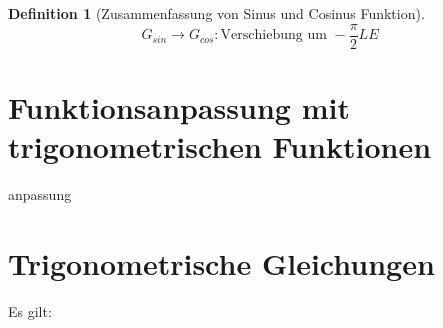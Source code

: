 \documentclass{book}
\newtheorem{definition}{Definition}
\begin{document}
\begin{definition}[Zusammenfassung von Sinus und Cosinus Funktion]
    
    \begin{displaymath}
        G_{sin} \to G_{cos}: \text{Verschiebung um } -\frac {\pi}{2}LE 
    \end{displaymath}
    
\end{definition}

\section{Funktionsanpassung mit trigonometrischen Funktionen}
    anpassung 
    \section{Trigonometrische Gleichungen}
    Es gilt:
\end{document}
